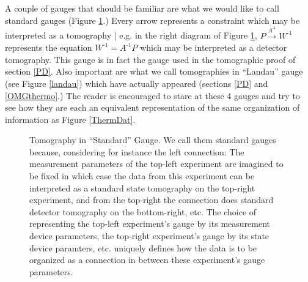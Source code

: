 \documentclass[pra, 10pt, notitlepage, twocolumn]{revtex4-1}
\newcommand{\inv}{\text{-1}}
\begin{document}
A couple of gauges that should be familiar are what we would like to call standard gauges (Figure \ref{standard}.)
Every arrow represents a constraint which may be interpreted as a tomography | e.g. in the right diagram of Figure \ref{standard}, $P\xrightarrow{A^\inv}W^\inv$ represents the equation $W^\inv = A^\inv P$ which may be interpreted as a detector tomography.
This gauge is in fact the gauge used in the tomographic proof of section \ref{PD}.
Also important are what we call tomographies in ``Landau'' gauge (see Figure \ref{landau}) which have actually appeared (sections \ref{PD} and \ref{OMGthermo}.)
The reader is encouraged to stare at these 4 gauges and try to see how they are each an equivalent representation of the same organization of information as Figure \ref{ThermDat}.
 
\begin{figure}[H]\centering
{}
\caption{Tomography in ``Standard'' Gauge.  We call them standard gauges because, considering for instance the left connection:
The measurement parameters of the top-left experiment are imagined to be fixed
in which case the data from this experiment can be interpreted as a standard state tomography on the top-right experiment, and from the top-right the connection does standard detector tomography on the bottom-right, etc.
The choice of representing the top-left experiment's gauge by its measurement device parameters, the top-right experiment's gauge by its state device paramters, etc.
uniquely defines how the data is to be organized as a connection in between these experiment's gauge parameters.
\label{standard}}
\end{figure}
\end{document}
